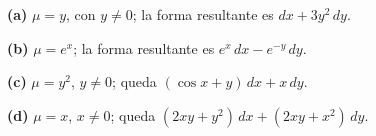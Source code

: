 \noindent\textbf{(a)} $\mu=y$, con $y\ne0$; la forma resultante es $dx+3y^2\,dy$.

\noindent\textbf{(b)} $\mu=e^x$; la forma resultante es $e^x\,dx-e^{-y}\,dy$.

\noindent\textbf{(c)} $\mu=y^2$, $y\ne0$; queda $(\cos x+y)\,dx+x\,dy$.

\noindent\textbf{(d)} $\mu=x$, $x\ne0$; queda $(2xy+y^2)\,dx+(2xy+x^2)\,dy$.
